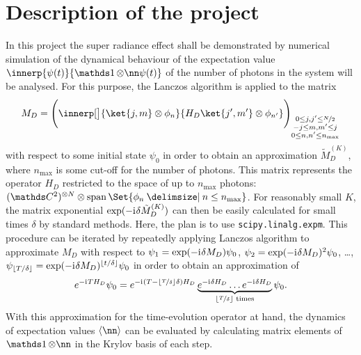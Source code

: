\section{Description of the project}\label{ch:project-description}
In this project the super radiance effect shall be demonstrated by numerical simulation of the dynamical behaviour of the expectation value \(\innerp{\psi(t)}{\one\otimes\nn \psi(t)}\) of the number of photons in the system will be analysed.
For this purpose, the Lanczos algorithm is applied to the matrix 
\begin{equation}
    M_D = \of[\Bigg]{ \innerp[\big]{\ket{j,m}\otimes\phi_n}{H_D \ket{j\primed,m\primed}\otimes\phi_{n\primed}} }_{\substack{
        0\leq j,j\primed \leq \nicefrac{N}{2}
        \\
        -j \leq m,m\primed \leq j
        \\
        0 \leq n, n\primed \leq n_{\mathrm{max}}
    }}
\end{equation}
with respect to some initial state \(\psi_0\) in order to obtain an approximation \(\tilde M_D^{(K)}\), where \(n_{\mathrm{max}}\) is some cut-off for the number of photons.
This matrix represents the operator \(H_D\) restricted to the space of up to \(n_{\mathrm{max}}\) photons: \((\C^2)^{\otimes N} \otimes \vecspan\Set{\phi_n \given n\leq n_{\mathrm{max}}}\).
For reasonably small \(K\), the matrix exponential \(\exp(-\mathrm{i}\mkern1mu \delta \tilde M_D^{(K)})\) can then be easily calculated for small times \(\delta\) by standard methods.
Here, the plan is to use \texttt{scipy.linalg.expm}.
This procedure can be iterated by repeatedly applying Lanczos algorithm to approximate \(M_D\) with respect to \(\psi_1 = \exp(-\mathrm{i}\mkern1mu \delta M_D) \psi_0\), \(\psi_2 = \exp(-\mathrm{i}\mkern1mu \delta M_D)^2 \psi_0\), \dots, \(\psi_{\lfloor T / \delta \rfloor} = \exp(-\mathrm{i}\mkern1mu \delta M_D)^{\lfloor t / \delta \rfloor} \psi_0\) in order to obtain an approximation of 
\begin{equation}
    e^{-\mathrm{i}\mkern1mu T H_D} \psi_0 = e^{-\mathrm{i}\mkern1mu (T-\lfloor \nicefrac{T}{\delta} \rfloor \delta) H_D} \underbrace{e^{-\mathrm{i}\mkern1mu \delta H_D} \dots e^{-\mathrm{i}\mkern1mu \delta H_D}}_{\lfloor \nicefrac{T}{\delta} \rfloor \text{ times}} \psi_0
    .
\end{equation}
With this approximation for the time-evolution operator at hand, the dynamics of expectation values \(\langle \nn \rangle\) can be evaluated by calculating matrix elements of \(\one\otimes\nn\) in the Krylov basis of each step.

